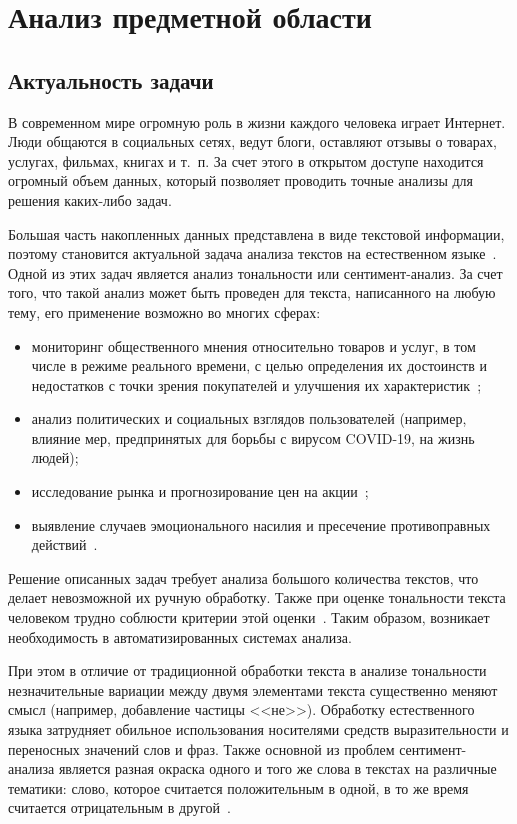 \chapter{Анализ предметной области}

\section{Актуальность задачи}

В современном мире огромную роль в жизни каждого человека играет Интернет.
Люди общаются в социальных сетях, ведут блоги, оставляют отзывы о товарах,
услугах, фильмах, книгах и т.~п. За счет этого в открытом доступе находится
огромный объем данных, который позволяет проводить точные анализы для
решения каких-либо задач.  

Большая часть накопленных данных представлена в виде текстовой информации,
поэтому становится актуальной задача анализа текстов на естественном
языке~\cite{article01}. Одной из этих задач является анализ тональности или
сентимент-анализ. За счет того, что такой анализ может быть проведен для текста,
написанного на любую тему, его применение возможно во многих сферах:
\begin{itemize}
    \item мониторинг общественного мнения относительно товаров
        и услуг, в том числе в режиме реального времени, с целью определения их
        достоинств и недостатков с точки зрения покупателей и улучшения их
        характеристик~\cite{article02};
    \item анализ политических и социальных взглядов пользователей (например,
        влияние мер, предпринятых для борьбы с вирусом COVID-19, на жизнь
        людей);
    \item исследование рынка и прогнозирование цен на акции~\cite{article03};
    \item выявление случаев эмоционального насилия и пресечение
        противоправных действий~\cite{article04}.
\end{itemize}

Решение описанных задач требует анализа большого количества текстов, что делает
невозможной их ручную обработку. Также при оценке тональности текста человеком
трудно соблюсти критерии этой оценки~\cite{article02}. Таким образом, возникает
необходимость в автоматизированных системах анализа.

При этом в отличие от традиционной обработки текста в анализе тональности
незначительные вариации между двумя элементами текста существенно меняют смысл
(например, добавление частицы <<не>>). Обработку естественного языка затрудняет
обильное использования носителями средств выразительности и переносных значений
слов и фраз. Также основной из проблем сентимент-анализа является разная окраска
одного и того же слова в текстах на различные тематики: слово, которое считается
положительным в одной, в то же время считается отрицательным в
другой~\cite{article03}.

